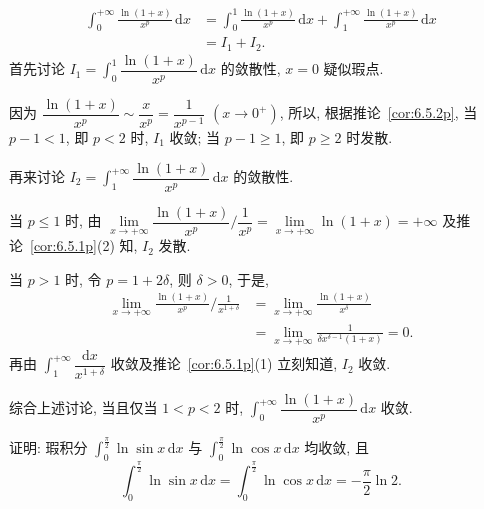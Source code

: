 \begin{solution}
\begin{align*}
\int_{0}^{+\infty}\frac{\ln(1+x)}{x^{p}}\,\mathrm{d}x&=\int_{0}^{1}\frac{\ln(1+x)}{x^{p}}\,\mathrm{d}x+\int_{1}^{+\infty}\frac{\ln(1+x)}{x^{p}}\,\mathrm{d}x\\
&=I_{1}+I_{2}.
\end{align*}
首先讨论 $I_{1}=\int_{0}^{1}\dfrac{\ln(1+x)}{x^{p}}\,\mathrm{d}x$ 的敛散性, $x=0$ 疑似瑕点.

因为 $\dfrac{\ln(1+x)}{x^{p}}\sim\dfrac{x}{x^{p}}=\dfrac{1}{x^{p-1}}$ $(x\to0^{+})$, 所以, 根据推论~\ref{cor:6.5.2p}, 当 $p-1<1$, 即 $p<2$ 时, $I_{1}$ 收敛; 当 $p-1\geqslant1$, 即 $p\geqslant2$ 时发散.

再来讨论 $I_{2}=\int_{1}^{+\infty}\dfrac{\ln(1+x)}{x^{p}}\,\mathrm{d}x$ 的敛散性.

当 $p\leqslant1$ 时, 由 $\lim\limits_{x\to+\infty}\dfrac{\ln(1+x)}{x^{p}}\Big/\dfrac{1}{x^{p}}=\lim\limits_{x\to+\infty}\ln(1+x)=+\infty$ 及推论~\ref{cor:6.5.1p}(2) 知, $I_{2}$ 发散.

当 $p>1$ 时, 令 $p=1+2\delta$, 则 $\delta>0$, 于是,
\begin{align*}
\lim_{x\to+\infty}\frac{\ln(1+x)}{x^{p}}\Big/\frac{1}{x^{1+\delta}}&=\lim_{x\to+\infty}\frac{\ln(1+x)}{x^{\delta}}\\
&=\lim_{x\to+\infty}\frac{1}{\delta x^{\delta-1}(1+x)}=0.
\end{align*}
再由 $\int_{1}^{+\infty}\dfrac{\mathrm{d}x}{x^{1+\delta}}$ 收敛及推论~\ref{cor:6.5.1p}(1) 立刻知道, $I_{2}$ 收敛.

综合上述讨论, 当且仅当 $1<p<2$ 时, $\int_{0}^{+\infty}\dfrac{\ln(1+x)}{x^{p}}\,\mathrm{d}x$ 收敛.
\end{solution}

\begin{example}\label{ex:6.5.18}
证明: 瑕积分 $\int_{0}^{\frac{\pi}{2}}\ln\sin x\,\mathrm{d}x$ 与 $\int_{0}^{\frac{\pi}{2}}\ln\cos x\,\mathrm{d}x$ 均收敛, 且
\[
\int_{0}^{\frac{\pi}{2}}\ln\sin x\,\mathrm{d}x=\int_{0}^{\frac{\pi}{2}}\ln\cos x\,\mathrm{d}x=-\frac{\pi}{2}\ln2.
\]
\end{example}

